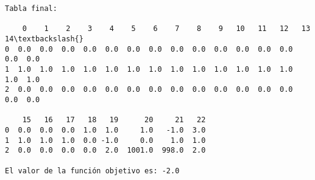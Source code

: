     \begin{Verbatim}[commandchars=\\\{\}]
Tabla final:

    0    1    2    3    4    5    6    7    8    9   10   11   12   13   14\textbackslash{}
0  0.0  0.0  0.0  0.0  0.0  0.0  0.0  0.0  0.0  0.0  0.0  0.0  0.0  0.0  0.0   
1  1.0  1.0  1.0  1.0  1.0  1.0  1.0  1.0  1.0  1.0  1.0  1.0  1.0  1.0  1.0   
2  0.0  0.0  0.0  0.0  0.0  0.0  0.0  0.0  0.0  0.0  0.0  0.0  0.0  0.0  0.0   

    15   16   17   18   19      20     21   22  
0  0.0  0.0  0.0  1.0  1.0     1.0   -1.0  3.0  
1  1.0  1.0  1.0  0.0 -1.0     0.0    1.0  1.0  
2  0.0  0.0  0.0  0.0  2.0  1001.0  998.0  2.0  

El valor de la función objetivo es: -2.0
\end{Verbatim}


